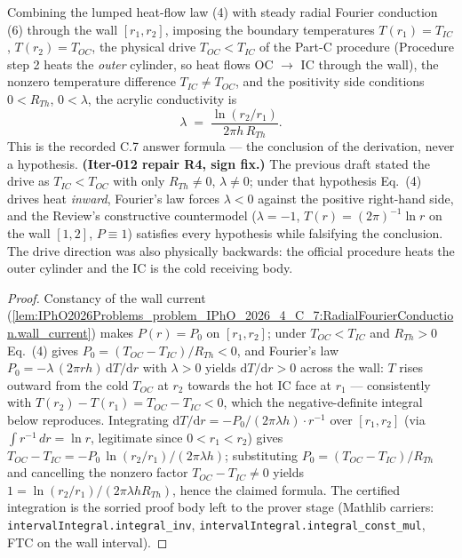 \begin{theorem}
\label{thm:IPhO2026Problems_problem_IPhO_2026_4_C_7:acrylicConductivity_formula}
Combining the lumped heat-flow law (4) with steady radial Fourier
conduction (6) through the wall $[r_1, r_2]$, imposing the boundary
temperatures $T(r_1) = T_{IC}$, $T(r_2) = T_{OC}$, the physical drive
$T_{OC} < T_{IC}$ of the Part-C procedure (Procedure step 2 heats the
\emph{outer} cylinder, so heat flows OC $\to$ IC through the wall), the
nonzero temperature difference $T_{IC} \ne T_{OC}$, and the positivity
side conditions $0 < R_{Th}$, $0 < \lambda$, the acrylic conductivity is
\[ \lambda \;=\; \frac{\ln(r_2/r_1)}{2\pi h\,R_{Th}}. \]
This is the recorded C.7 answer formula --- the conclusion of the
derivation, never a hypothesis.  \textbf{(Iter-012 repair R4, sign fix.)}
The previous draft stated the drive as $T_{IC} < T_{OC}$ with only
$R_{Th} \ne 0$, $\lambda \ne 0$; under that hypothesis Eq.\ (4) drives
heat \emph{inward}, Fourier's law forces $\lambda < 0$ against the
positive right-hand side, and the Review's constructive countermodel
($\lambda = -1$, $T(r) = (2\pi)^{-1}\ln r$ on the wall $[1,2]$,
$P \equiv 1$) satisfies every hypothesis while falsifying the conclusion.
The drive direction was also physically backwards: the official procedure
heats the outer cylinder and the IC is the cold receiving body.
\end{theorem}
\begin{proof}
Constancy of the wall current
(\cref{lem:IPhO2026Problems_problem_IPhO_2026_4_C_7:RadialFourierConduction.wall_current})
makes $P(r) = P_0$ on $[r_1, r_2]$; under $T_{OC} < T_{IC}$ and
$R_{Th} > 0$ Eq.\ (4) gives $P_0 = (T_{OC}-T_{IC})/R_{Th} < 0$, and
Fourier's law $P_0 = -\lambda\,(2\pi r h)\,\mathrm{d}T/\mathrm{d}r$
with $\lambda > 0$ yields $\mathrm{d}T/\mathrm{d}r > 0$ across the wall:
$T$ rises outward from the cold $T_{OC}$ at $r_2$ towards the hot IC face
at $r_1$ --- consistently with $T(r_2) - T(r_1) = T_{OC} - T_{IC} < 0$,
which the negative-definite integral below reproduces.  Integrating
$\mathrm{d}T/\mathrm{d}r = -P_0/(2\pi\lambda h)\cdot r^{-1}$ over
$[r_1, r_2]$ (via $\int r^{-1}\,dr = \ln r$, legitimate since
$0 < r_1 < r_2$) gives
$T_{OC} - T_{IC} = -P_0\,\ln(r_2/r_1)/(2\pi\lambda h)$; substituting
$P_0 = (T_{OC} - T_{IC})/R_{Th}$ and cancelling the nonzero factor
$T_{OC} - T_{IC} \ne 0$ yields
$1 = \ln(r_2/r_1)/(2\pi\lambda h R_{Th})$, hence the claimed formula.
The certified integration is the sorried proof body left to the prover
stage (Mathlib carriers: \texttt{intervalIntegral.integral\_inv},
\texttt{intervalIntegral.integral\_const\_mul}, FTC on the wall interval).
\end{proof}

